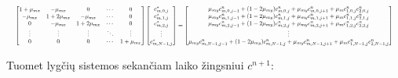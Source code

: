 \begin{align*}
  \resizebox{\textwidth}{!}{$
  \begin{bmatrix}
    1 + \mu_{mx} & -\mu_{mx} & 0 & \cdots & 0\\
    -\mu_{mx} & 1 + 2\mu_{mx} & -\mu_{mx} & \cdots & 0\\
    0 & -\mu_{mx} & 1 + 2\mu_{mx} & \cdots & 0\\
    \vdots & \vdots & \vdots & \ddots & \vdots\\
    0 & 0 & 0 & \cdots & 1 + \mu_{mx}
  \end{bmatrix}
  \begin{bmatrix}
    c^*_{m,0,j}\\
    c^*_{m,1,j}\\
    c^*_{m,2,j}\\
    \vdots\\
    c^*_{m,N-1,j}
  \end{bmatrix}
  =
  \begin{bmatrix}
    \mu_{my}c^n_{m,0,j-1}+(1-2\mu_{my})c^n_{m,0,j}+\mu_{my}c^n_{m,0,j+1}+\mu_m c^n_{1,0,j}c^n_{2,0,j}\\
    \mu_{my}c^n_{m,1,j-1}+(1-2\mu_{my})c^n_{m,1,j}+\mu_{my}c^n_{m,1,j+1}+\mu_m c^n_{1,1,j}c^n_{2,1,j}\\
    \mu_{my}c^n_{m,2,j-1}+(1-2\mu_{my})c^n_{m,2,j}+\mu_{my}c^n_{m,2,j+1}+\mu_m c^n_{1,2,j}c^n_{2,2,j}\\
    \vdots\\
    \mu_{my}c^n_{m,N-1,j-1}+(1-2\mu_{my})c^n_{m,N-1,j}+\mu_{my}c^n_{m,N-1,j+1}+\mu_m c^n_{1,N-1,j}c^n_{2,N-1,j}
  \end{bmatrix}
  $}
\end{align*}

Tuomet lygčių sistemos sekančiam laiko žingsniui $c^{n+1}$:

